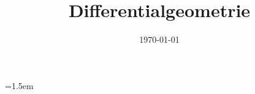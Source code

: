 \documentclass{mycourse}
\title{Differentialgeometrie}
\date{\today}
\begin{document}
\emergencystretch=1.5em

\maketitle

\tableofcontents



\end{document}
